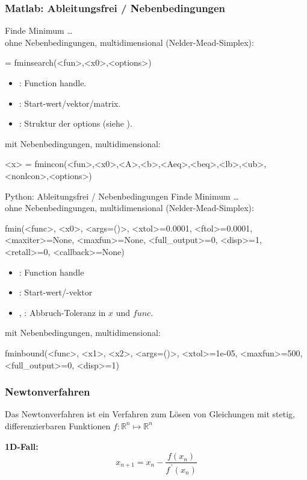 \documentclass[hyperref={xetex}]{beamer}
\begin{document}
\begin{frame}[fragile]\frametitle{Matlab: Ableitungsfrei / Nebenbedingungen}
Finde Minimum \ldots \\

ohne Nebenbedingungen, multidimensional (Nelder-Mead-Simplex):
\begin{matlabin}
  = fminsearch(<fun>,<x0>,<options>)
\end{matlabin}
\begin{itemize}
 \item {}: Function handle.
\item {}: Start-wert/vektor/matrix.
\item {}: Struktur der options (siehe ).
\end{itemize}

mit Nebenbedingungen, multidimensional:
\begin{matlabin}
<x> = fmincon(<fun>,<x0>,<A>,<b>,<Aeq>,<beq>,<lb>,<ub>,<nonlcon>,<options>)
\end{matlabin}

\end{frame}

\begin{frame}[fragile]{Python: Ableitungsfrei / Nebenbedingungen}
Finde Minimum \ldots \\

ohne Nebenbedingungen, multidimensional (Nelder-Mead-Simplex):
  \begin{pyin}
fmin(<func>, <x0>, <args=()>, <xtol>=0.0001, <ftol>=0.0001, <maxiter>=None, <maxfun>=None, <full_output>=0, <disp>=1, <retall>=0, <callback>=None)
  \end{pyin}
  \begin{itemize}
    \item {}: Function handle
    \item {}: Start-wert/-vektor
    \item {}, : Abbruch-Toleranz in $x$ und $func$.
  \end{itemize}
mit Nebenbedingungen, multidimensional:
  \begin{pyin}
fminbound(<func>, <x1>, <x2>, <args=()>, <xtol>=1e-05, <maxfun>=500, <full_output>=0, <disp>=1)    
  \end{pyin}
\end{frame}

\begin{frame}[fragile]\frametitle{Newtonverfahren}

Das Newtonverfahren ist ein Verfahren zum Lösen von Gleichungen mit stetig, differenzierbaren 
Funktionen $f:\mathbb{R}^n \mapsto \mathbb{R}^n$

\textbf{1D-Fall:}
\[
 x_{n+1} = x_n - \frac{f(x_n)}{f^{\,\prime}(x_n)}
\]

\end{frame}
\end{document}
